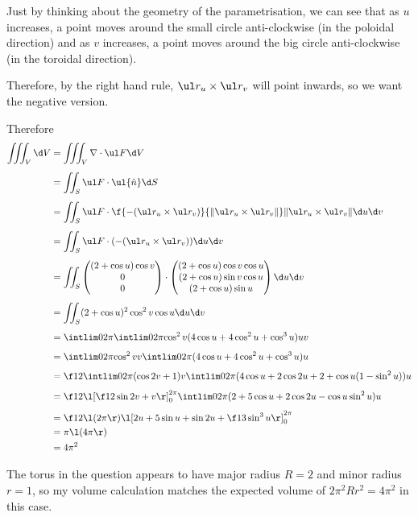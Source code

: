 \documentclass[a4paper]{article}
\begin{document}
Just by thinking about the geometry of the parametrisation, we can see that as $u$ increases, a point moves around the small circle anti-clockwise (in the poloidal direction) and as $v$ increases, a point moves around the big circle anti-clockwise (in the toroidal direction).

Therefore, by the right hand rule, $\ul r_u \times \ul r_v$ will point inwards, so we want the negative version.

Therefore \begin{align*}
\iiint_V \d V &= \iiint_V \nabla \cdot \ul F \d V\\[1ex]
&= \iint_S \ul F \cdot \ul{\hat n} \d S\\[1ex]
&= \iint_S \ul F \cdot \f{-(\ul r_u \times \ul r_v)}{\| \ul r_u \times \ul r_v \|} \| \ul r_u \times \ul r_v \| \d u \d v \\[1ex]
&= \iint_S \ul F \cdot (-(\ul r_u \times \ul r_v)) \d u \d v \\[1ex]
&= \iint_S \begin{pmatrix} (2 + \cos u) \cos v \\ 0 \\ 0 \end{pmatrix} \cdot \begin{pmatrix} (2 + \cos u) \cos v \cos u \\ (2 + \cos u) \sin v \cos u \\ (2 + \cos u) \sin u \end{pmatrix} \d u \d v \\[1ex]
&= \iint_S (2 + \cos u)^2 \cos^2 v \cos u \d u \d v \\[1ex]
&= \intlim 0{2\pi} {\intlim 0{2\pi} {\cos^2 v (4 \cos u + 4 \cos^2 u + \cos^3 u)} u} v\\[1ex]
&= \intlim 0{2\pi} {\cos^2 v} v \intlim 0{2\pi} {(4 \cos u + 4 \cos^2 u + \cos^3 u)} u\\[1ex]
&= \f12 \intlim 0{2\pi} {(\cos 2v + 1)} v \intlim 0{2\pi} {(4 \cos u + 2 \cos 2u + 2 + \cos u (1 - \sin^2 u))} u\\[1ex]
&= \f12 \l[ \f12 \sin 2v + v \r]_0^{2\pi} \intlim 0{2\pi} {(2 + 5 \cos u + 2 \cos 2u - \cos u \sin^2 u)} u\\[1ex]
&= \f12 \l( 2 \pi \r) \l[ 2u + 5 \sin u + \sin 2u + \f13 \sin^3 u \r]_0^{2\pi}\\
&= \pi \l( 4\pi \r)\\
&= 4 \pi^2
\end{align*}

The torus in the question appears to have major radius $R=2$ and minor radius $r=1$, so my volume calculation matches the expected volume of $2\pi^2 R r^2 = 4\pi^2$ in this case.

\end{document}
